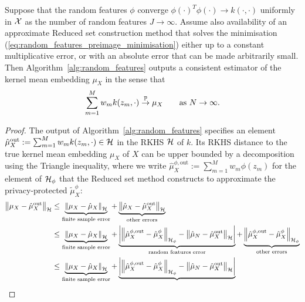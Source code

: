 \begin{hthm}[\ref{thm:random_features_consistency}]
	\label{app:thm:random_features}
	Suppose that the random features $\phi$ converge $\phi(\cdot)^T \phi(\cdot) \to k(\cdot, \cdot)$ uniformly in $\mathcal{X}$ as the number of random features $J \to \infty$. Assume also availability of an approximate Reduced set construction method that solves the minimisation (\ref{eq:random_features_preimage_minimisation}) either up to a constant multiplicative error, or with an absolute error that can be made arbitrarily small. Then Algorithm~\ref{alg:random_features} outputs a consistent estimator of the kernel mean embedding $\mu_X$ in the sense that
	\begin{equation}
	\sum_{m = 1}^M w_m k(z_m, \cdot)
	\stackrel{\mathbb{P}}{\to}
	\mu_X
	\hspace{2em} \text{as } N \to \infty
	.
	\end{equation}
	\begin{proof}
		The output of Algorithm~\ref{alg:random_features} specifies an element $\hat{\mu}^{\text{out}}_X := \sum_{m = 1}^M w_m k(z_m, \cdot) \in \mathcal{H}$ in the RKHS $\mathcal{H}$ of $k$. Its RKHS distance to the true kernel mean embedding $\mu_X$ of $X$ can be upper bounded by a decomposition using the Triangle inequality, where we write $\hat{\mu}^{\phi, \text{out}}_X := \sum_{m = 1}^M w_m \phi(z_m)$ for the element of $\mathcal{H}_{\phi}$ that the Reduced set method constructs to approximate the privacy-protected $\tilde{\mu}^{\phi}_X$:
		\begin{align}
		\left\| \mu_X - \hat{\mu}^{\text{out}}_X \right\|_{\mathcal{H}}
		&\leq
		\underbrace{
			\left\| \mu_X - \hat{\mu}_X \right\|_{\mathcal{H}}
		}_{\text{finite sample error}}
		+
		\underbrace{
			\left\| \hat{\mu}_X - \hat{\mu}^{\text{out}}_X \right\|_{\mathcal{H}}
		}_{\text{other errors}}
		\nonumber\\&\leq
		\underbrace{
			\left\| \mu_X - \hat{\mu}_X \right\|_{\mathcal{H}}
		}_{\text{finite sample error}}
		+
		\underbrace{
			\left| \left\| \hat{\mu}^{\phi, \text{out}}_X - \hat{\mu}^{\phi}_X \right\|_{\mathcal{H}_{\phi}} - \left\| \hat{\mu}_N - \hat{\mu}^{\text{out}}_X \right\|_{\mathcal{H}} \right|
		}_{\text{random features error}}
		+
		\underbrace{
			\left\| \hat{\mu}^{\phi, \text{out}}_X - \hat{\mu}^{\phi}_X \right\|_{\mathcal{H}_{\phi}}
		}_{\text{other errors}}
		\nonumber\\&\leq
		\underbrace{
			\left\| \mu_X - \hat{\mu}_X \right\|_{\mathcal{H}}
		}_{\text{finite sample error}}
		+
		\underbrace{
			\left| \left\| \hat{\mu}^{\phi, \text{out}}_X - \hat{\mu}^{\phi}_X \right\|_{\mathcal{H}_{\phi}} - \left\| \hat{\mu}_N - \hat{\mu}^{\text{out}}_X \right\|_{\mathcal{H}} \right|
}
\end{align}
\end{proof}
\end{hthm}
